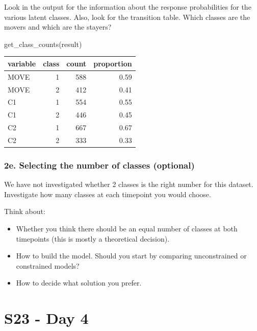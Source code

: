 \documentclass[
]{book}
\newenvironment{Shaded}{\begin{snugshade}}{\end{snugshade}}
\newcommand{\FunctionTok}[1]{\textcolor[rgb]{0.00,0.00,0.00}{#1}}
\newcommand{\NormalTok}[1]{#1}
\providecommand{\tightlist}{%
  \setlength{\itemsep}{0pt}\setlength{\parskip}{0pt}}
\begin{document}
Look in the output for the information about the response probabilities for the various latent classes. Also, look for the transition table. Which classes are the movers and which are the stayers?

\begin{Shaded}
\begin{Highlighting}[]
\FunctionTok{get\_class\_counts}\NormalTok{(result)}
\end{Highlighting}
\end{Shaded}

\begin{tabular}[t]{l|r|r|r}
\hline
variable & class & count & proportion\\
\hline
MOVE & 1 & 588 & 0.59\\
\hline
MOVE & 2 & 412 & 0.41\\
\hline
C1 & 1 & 554 & 0.55\\
\hline
C1 & 2 & 446 & 0.45\\
\hline
C2 & 1 & 667 & 0.67\\
\hline
C2 & 2 & 333 & 0.33\\
\hline
\end{tabular}

\hypertarget{e.-selecting-the-number-of-classes-optional}{%
\subsection{2e. Selecting the number of classes (optional)}\label{e.-selecting-the-number-of-classes-optional}}

We have not investigated whether 2 classes is the right number for this dataset. Investigate how many classes at each timepoint you would choose.

Think about:

\begin{itemize}
\tightlist
\item
  Whether you think there should be an equal number of classes at both timepoints (this is mostly a theoretical decision).
\item
  How to build the model. Should you start by comparing unconstrained or constrained models?
\item
  How to decide what solution you prefer.
\end{itemize}

\hypertarget{s23---day-4}{%
\chapter*{S23 - Day 4}\label{s23---day-4}}
\end{document}
